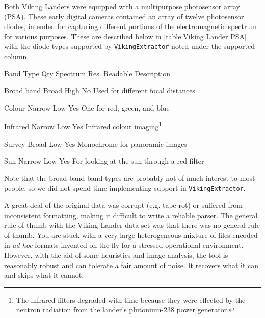 Both Viking Landers were equipped with a multipurpose photosensor array (PSA). These early digital cameras contained an array of twelve photosensor diodes, intended for capturing different portions of the electromagnetic spectrum for various purposes. These are described below in [table:Viking Lander PSA] with the diode types supported by {\tt VikingExtractor} noted under the supported column.

{
    \bTABLE[split=repeat,option=stretch]
    \setupTABLE[column][6]
        [width=.38\textwidth,
        align=yes]
    \setupTABLE[row][each][align=center]
    \setupTABLE[4][1][align=center]

\bTABLEhead
    \bTR[bottomframe=on]
      \bTH  Band Type \eTH
      \bTH  Qty \eTH
      \bTH  Spectrum \eTH
      \bTH  Res. \eTH
      \bTH  Readable \eTH
      \bTH  Description \eTH
    \eTR
\eTABLEhead

\bTABLEbody
    \bTR
      \bTC Broad band \eTC
       \eTC
      \bTC Broad \eTC
      \bTC High \eTC
      \bTC No \eTC
      \bTC Used for different focal distances \eTC
    \eTR

    \bTR
      \bTC Colour \eTC
       \eTC
      \bTC Narrow \eTC
      \bTC Low \eTC
      \bTC Yes \eTC
      \bTC One for red, green, and blue \eTC
    \eTR

    \bTR
      \bTC Infrared \eTC
       \eTC
      \bTC Narrow \eTC
      \bTC Low \eTC
      \bTC Yes \eTC
      \bTC Infrared colour imaging\footnote{The infrared filters degraded with time because they were effected by the neutron radiation from the lander's plutonium-238 power generator.} \eTC
    \eTR

    \bTR
      \bTC Survey \eTC
       \eTC
      \bTC Broad \eTC
      \bTC Low \eTC
      \bTC Yes \eTC
      \bTC Monochrome for panoramic images \eTC
    \eTR
    
    \bTR
      \bTC Sun \eTC
       \eTC
      \bTC Narrow \eTC
      \bTC Low \eTC
      \bTC Yes \eTC
      \bTC For looking at the sun through a red filter \eTC
    \eTR

\eTABLEbody

\eTABLE
}

Note that the broad band band types are probably not of much interest to most people, so we did not spend time implementing support in {\tt VikingExtractor}.

A great deal of the original data was corrupt (e.g. tape rot) or suffered from inconsistent formatting, making it difficult to write a reliable parser. The general rule of thumb with the Viking Lander data set was that there was no general rule of thumb. You are stuck with a very large heterogeneous mixture of files encoded in {\it ad hoc} formats invented on the fly for a stressed operational environment. However, with the aid of some heuristics and image analysis, the tool is reasonably robust and can tolerate a fair amount of noise. It recovers what it can and skips what it cannot.

